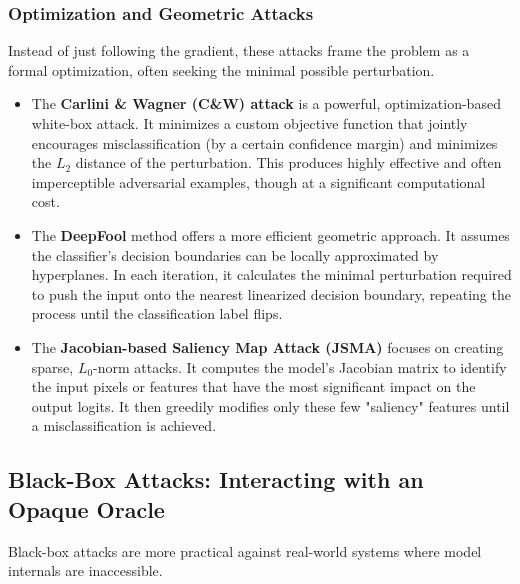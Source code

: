 \documentclass[../main.tex]{subfiles}
\begin{document}
\subsubsection{Optimization and Geometric Attacks}
Instead of just following the gradient, these attacks frame the problem as a formal optimization, often seeking the minimal possible perturbation.
\begin{itemize}
    \item The \textbf{Carlini \& Wagner (C\&W) attack} \cite{carlini2017evaluatingrobustnessneuralnetworks} is a powerful, optimization-based white-box attack. It minimizes a custom objective function that jointly encourages misclassification (by a certain confidence margin) and minimizes the $L_2$ distance of the perturbation. This produces highly effective and often imperceptible adversarial examples, though at a significant computational cost.
    \item The \textbf{DeepFool} method \cite{moosavidezfooli2016deepfoolsimpleaccuratemethod} offers a more efficient geometric approach. It assumes the classifier's decision boundaries can be locally approximated by hyperplanes. In each iteration, it calculates the minimal perturbation required to push the input onto the nearest linearized decision boundary, repeating the process until the classification label flips.
    \item The \textbf{Jacobian-based Saliency Map Attack (JSMA)} \cite{papernot2016limitations} focuses on creating sparse, $L_0$-norm attacks. It computes the model's Jacobian matrix to identify the input pixels or features that have the most significant impact on the output logits. It then greedily modifies only these few "saliency" features until a misclassification is achieved.
\end{itemize}

\subsection{Black-Box Attacks: Interacting with an Opaque Oracle}
Black-box attacks are more practical against real-world systems where model internals are inaccessible.
\end{document}
